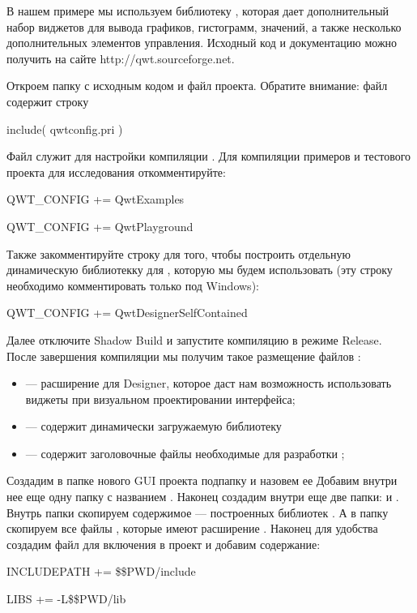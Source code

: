 В нашем примере мы используем библиотеку , которая дает дополнительный набор виджетов для вывода графиков,
гистограмм, значений, а также несколько дополнительных элементов управления. Исходный код и документацию можно получить
на сайте http://qwt.sourceforge.net. 

Откроем папку с исходным кодом и файл проекта. Обратите внимание: файл 
содержит строку 

include( qwtconfig.pri )

Файл  служит для настройки компиляции . Для компиляции примеров и тестового проекта для
исследования  откомментируйте: 

QWT\_CONFIG  += QwtExamples

QWT\_CONFIG  += QwtPlayground

Также закомментируйте строку для того, чтобы построить отдельную динамическую библиотекку для , которую мы будем
использовать (эту строку необходимо комментировать только под Windows): 

 QWT\_CONFIG  += QwtDesignerSelfContained

Далее отключите Shadow Build и запустите компиляцию в режиме Release. После завершения компиляции мы получим такое
размещение файлов :

\begin{itemize}
\item {}--- расширение для Designer, которое даст нам возможность
использовать виджеты  при визуальном проектировании интерфейса;
\item {} --- содержит динамически загружаемую библиотеку  
\item {} --- содержит заголовочные файлы необходимые для разработки ;
\end{itemize}
Создадим в папке нового GUI проекта подпапку и назовем ее  Добавим внутри нее еще одну папку с
названием . Наконец создадим внутри  еще две папки:  и
. Внутрь папки  скопируем содержимое  --- построенных
библиотек  . А в папку  скопируем все файлы , которые
имеют расширение . Наконец для удобства создадим файл для включения в проект 
 и добавим содержание:

INCLUDEPATH += \$\$PWD/include

LIBS += -L\$\$PWD/lib

